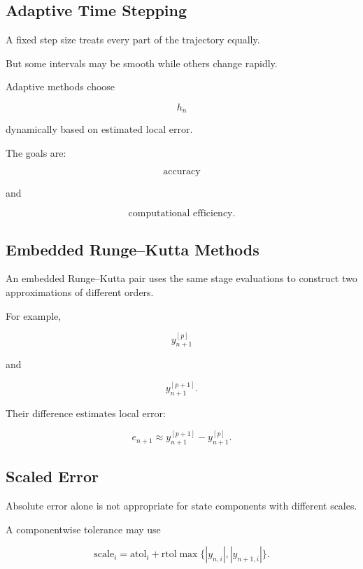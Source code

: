 \subsection{Adaptive Time Stepping}
\label{subsec:adaptive-time-stepping}

A fixed step size treats every part of the trajectory equally.

But some intervals may be smooth while others change rapidly.

Adaptive methods choose

\[
\boxed{
h_n
}
\]

dynamically based on estimated local error.

The goals are:

\[
\boxed{
\text{accuracy}
}
\]

and

\[
\boxed{
\text{computational efficiency}.
}
\]

\subsection{Embedded Runge--Kutta Methods}
\label{subsec:embedded-runge-kutta}

An embedded Runge--Kutta pair uses the same stage evaluations to construct
two approximations of different orders.

For example,

\[
\boxed{
y_{n+1}^{[p]}
}
\]

and

\[
\boxed{
y_{n+1}^{[p+1]}.
}
\]

Their difference estimates local error:

\[
\boxed{
e_{n+1}
\approx
y_{n+1}^{[p+1]}
-
y_{n+1}^{[p]}.
}
\]

\subsection{Scaled Error}
\label{subsec:ode-scaled-error}

Absolute error alone is not appropriate for state components with
different scales.

A componentwise tolerance may use

\[
\boxed{
\mathrm{scale}_i
=
\mathrm{atol}_i
+
\mathrm{rtol}
\max
\{
|y_{n,i}|,
|y_{n+1,i}|
\}.
}
\]

